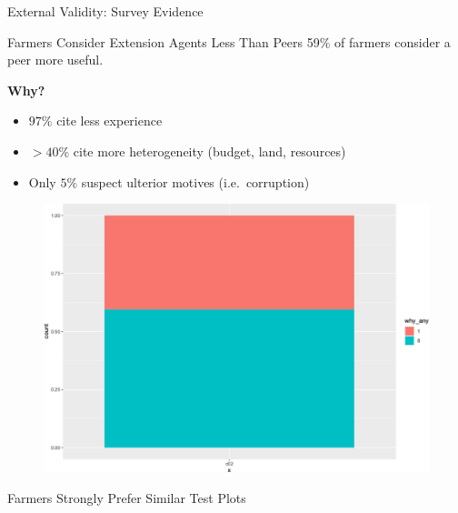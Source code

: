 \documentclass[
  ignorenonframetext,
]{beamer}
\providecommand{\tightlist}{%
  \setlength{\itemsep}{0pt}\setlength{\parskip}{0pt}}\usepackage{longtable,booktabs,array}
\begin{document}
\begin{frame}{External Validity: Survey Evidence}
\protect\hypertarget{external-validity-survey-evidence}{}
\end{frame}

\begin{frame}{Farmers Consider Extension Agents Less Than Peers}
\protect\hypertarget{farmers-consider-extension-agents-less-than-peers}{}
59\% of farmers consider a peer more useful.

\textbf{Why?}

\begin{itemize}[<+->]
\tightlist
\item
  \(97\%\) cite less experience
\item
  \(> 40\%\) cite more heterogeneity (budget, land, resources)
\item
  Only \(5\%\) suspect ulterior motives (i.e.~corruption)
\end{itemize}

\begin{figure}

{\centering \includegraphics{presentation2_files/figure-beamer/unnamed-chunk-7-1.svg}

}

\end{figure}

\begin{frame}{Farmers Strongly Prefer Similar Test Plots}
\protect\hypertarget{farmers-strongly-prefer-similar-test-plots}{}
\begin{figure}


\end{figure}
\end{frame}
\end{frame}
\end{document}
